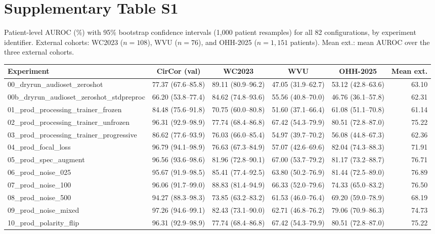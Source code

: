 \documentclass[10pt]{article}
\begin{document}
\section*{Supplementary Table S1}
Patient-level AUROC (\%) with 95\% bootstrap confidence intervals (1,000 patient resamples) for all 82
configurations, by experiment identifier. External cohorts: WC2023 ($n=108$), WVU ($n=76$), and OHH-2025
($n=1{,}151$ patients). Mean ext.: mean AUROC over the three external cohorts.
\begin{longtable}{lccccr}
\toprule
Experiment & CirCor (val) & WC2023 & WVU & OHH-2025 & Mean ext. \\
\midrule
\endhead
00\_dryrun\_audioset\_zeroshot & 77.37 (67.6--85.8) & 89.11 (80.9--96.2) & 47.05 (31.9--62.7) & 53.12 (42.8--63.6) & 63.10 \\
00b\_dryrun\_audioset\_zeroshot\_stdpreproc & 66.20 (53.8--77.4) & 84.62 (74.8--93.6) & 55.56 (40.8--70.0) & 46.76 (36.1--57.8) & 62.31 \\
01\_prod\_processing\_trainer\_frozen & 84.48 (75.6--91.8) & 70.75 (60.0--80.8) & 51.60 (37.1--66.4) & 61.08 (51.1--70.8) & 61.14 \\
02\_prod\_processing\_trainer\_unfrozen & 96.31 (92.9--98.9) & 77.74 (68.4--86.8) & 67.42 (54.3--79.9) & 80.51 (72.8--87.0) & 75.22 \\
03\_prod\_processing\_trainer\_progressive & 86.62 (77.6--93.9) & 76.03 (66.0--85.4) & 54.97 (39.7--70.2) & 56.08 (44.8--67.3) & 62.36 \\
04\_prod\_focal\_loss & 96.79 (94.1--98.9) & 76.63 (67.3--84.9) & 57.07 (42.6--69.6) & 82.04 (74.3--88.3) & 71.91 \\
05\_prod\_spec\_augment & 96.56 (93.6--98.6) & 81.96 (72.8--90.1) & 67.00 (53.7--79.2) & 81.17 (73.2--88.7) & 76.71 \\
06\_prod\_noise\_025 & 95.67 (91.9--98.5) & 85.41 (77.4--92.5) & 63.80 (50.2--76.9) & 81.44 (72.5--89.0) & 76.89 \\
07\_prod\_noise\_100 & 96.06 (91.7--99.0) & 88.83 (81.4--94.9) & 66.33 (52.0--79.6) & 74.33 (65.0--83.2) & 76.50 \\
08\_prod\_noise\_500 & 94.27 (88.3--98.3) & 73.85 (63.2--83.2) & 61.53 (46.0--76.4) & 69.20 (59.0--78.9) & 68.19 \\
09\_prod\_noise\_mixed & 97.26 (94.6--99.1) & 82.43 (73.1--90.0) & 62.71 (46.8--76.2) & 79.06 (70.9--86.3) & 74.73 \\
10\_prod\_polarity\_flip & 96.31 (92.9--98.9) & 77.74 (68.4--86.8) & 67.42 (54.3--79.9) & 80.51 (72.8--87.0) & 75.22 \\

\end{longtable}
\end{document}

